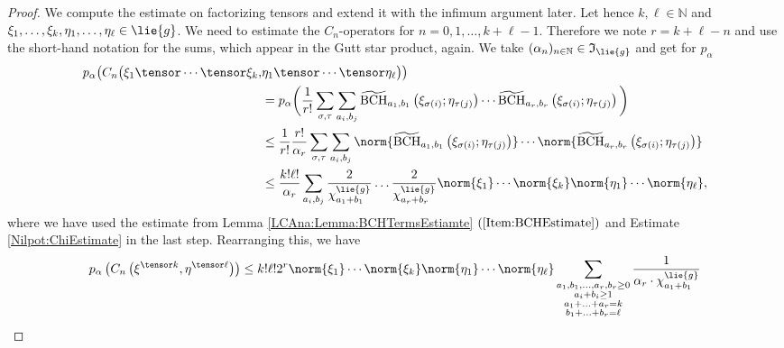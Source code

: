 \begin{proof}
	We compute the estimate on factorizing tensors and extend it with the 
	infimum argument later. Let hence $k, \ell \in \mathbb{N}$ and 
	$\xi_1, \ldots, \xi_k, \eta_1, \ldots, \eta_\ell \in \lie{g}$. 
	We need to estimate the $C_n$-operators for $n = 0, 1, \ldots, k + \ell - 1$. 
	Therefore we note $r = k + \ell - n$ and use the short-hand notation for the 
	sums, which appear in the Gutt star product, again.
	We take $(\alpha_n)_{n \in \mathbb{N}} \in \mathfrak{I}_{\lie{g}}$ and get 
	for $p_{\alpha}$
	\begin{align*}
		p_{\alpha} \big(
			C_n \big( 
			\xi_1 \tensor \cdots \tensor \xi_k,
		&
			\eta_1 \tensor \cdots \tensor \eta_\ell 
			\big)
		\big)
		\\
		& =
		p_{\alpha}
		\bigg(
         	\frac{1}{r!}
			\sum\limits_{\sigma, \tau}
			\sum\limits_{a_i, b_j}
			\bchtilde{a_1}{b_1}{\xi_{\sigma(i)}}{\eta_{\tau(j)}}
			\cdots
			\bchtilde{a_r}{b_r}{\xi_{\sigma(i)}}{\eta_{\tau(j)}}
        \bigg)
        \\
        & \leq 
    		\frac{1}{r!}
    		\frac{r!}{\alpha_r}
    		\sum\limits_{\sigma, \tau}
			\sum\limits_{a_i, b_j}
       	\norm{
    			\bchtilde{a_1}{b_1}{\xi_{\sigma(i)}}{\eta_{\tau(j)}}
    		}
    		\cdots
    		\norm{
    			\bchtilde{a_r}{b_r}{\xi_{\sigma(i)}}{\eta_{\tau(j)}}
    		}
        \\
        & \leq
    	\frac{k! \ell!}{\alpha_r}
    	\sum\limits_{a_i, b_j}
       	\frac{2}{\chi_{a_1 + b_1}^{\lie{g}}}
       	\ldots
       	\frac{2}{\chi_{a_r + b_r}^{\lie{g}}}
       	\norm{\xi_1} \cdots \norm{\xi_k}
       	\norm{\eta_1} \cdots \norm{\eta_\ell},
    \end{align*}
	where we have used the estimate from Lemma \ref{LCAna:Lemma:BCHTermsEstiamte}
	 $(\ref{Item:BCHEstimate})$ and Estimate \eqref{Nilpot:ChiEstimate}
	in the last step. Rearranging this, we have
	\begin{equation*}
		p_{\alpha} \left(
			C_n\left( \xi^{\tensor k}, \eta^{\tensor \ell} \right)
		\right)
		\leq
    	k! \ell! 2^r
       	\norm{\xi_1} \cdots \norm{\xi_k}
       	\norm{\eta_1} \cdots \norm{\eta_\ell}
    		\sum\limits_{\substack{a_1, b_1, \ldots, a_r, b_r \geq 0 \\
        		a_i + b_i \geq 1 \\
        		a_1 + \ldots + a_r = k \\
        		b_1 + \ldots + b_r = \ell
       	}}
       	\frac{1}
       	{
       		\alpha_r
       		\cdot
       		\chi^{\lie{g}}_{a_1 + b_1}
}
\end{equation*}
\end{proof}
